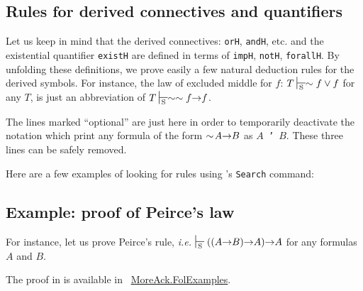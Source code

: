 


\subsection{Rules for derived connectives and quantifiers}

Let us keep in mind that the derived connectives: \texttt{orH}, \texttt{andH}, etc. and the existential quantifier \texttt{existH}  are defined
in terms of \texttt{impH}, \texttt{notH}, \texttt{forallH}.
By unfolding these definitions, we prove easily a few natural deduction rules for the derived symbols. 
For instance, the law of excluded middle for $f$: $ T\sdash \sim f \vee f$
for any $T$,  is just an abbreviation of $T \sdash \sim\sim{}f \arrow f$.



\begin{remark}
  The lines marked ``optional'' are just here in order to
temporarily deactivate the notation which print any formula 
of the form $\sim{}\!A \mbox{$\rightarrow$} B$ as \texttt{$A$ \disj' $B$}.
 These three lines can be safely removed.
\end{remark}






Here are a few examples of looking for rules using \coq's \texttt{Search} command:




\subsection{Example: proof of Peirce's law}

For instance, let us prove Peirce's rule, \emph{i.e.}
$\sdash ((A \arrow B) \arrow A) \arrow A$ for any formulas $A$ and $B$.

 The proof in \coq is available in  ~\href{../theories/html/hydras.MoreAck.FolExamples.html}{MoreAck.FolExamples}.

